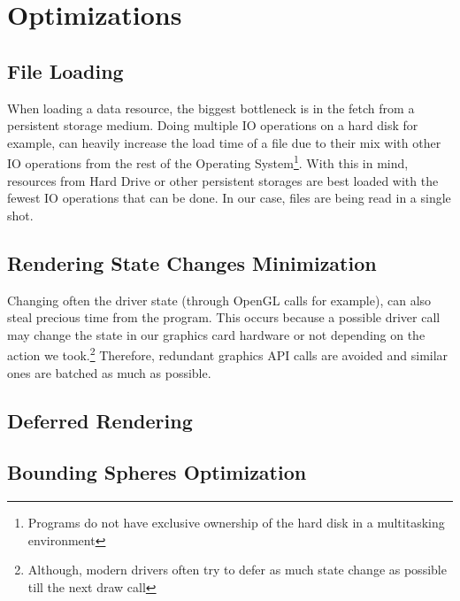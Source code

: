 \section{Optimizations}

\subsection{File Loading}
When loading a data resource, the biggest bottleneck is in the fetch from a persistent storage medium.
Doing multiple IO operations on a hard disk for example, can heavily increase the load time of a file
due to their mix with other IO operations from the rest of the Operating System\footnote{Programs do
not have exclusive ownership of the hard disk in a multitasking environment}. With this in mind, resources
from Hard Drive or other persistent storages are best loaded with the fewest IO operations that can be done.
In our case, files are being read in a single shot.

\subsection{Rendering State Changes Minimization}
Changing often the driver state (through OpenGL calls for example), can also steal precious time from the program.
This occurs because a possible driver call may change the state in our graphics card hardware or not depending
on the action we took.\footnote{Although, modern drivers often try to defer as much state change as possible
till the next draw call} Therefore, redundant graphics API calls are avoided and similar ones are batched
as much as possible.

\subsection{Deferred Rendering}

\subsection{Bounding Spheres Optimization}
